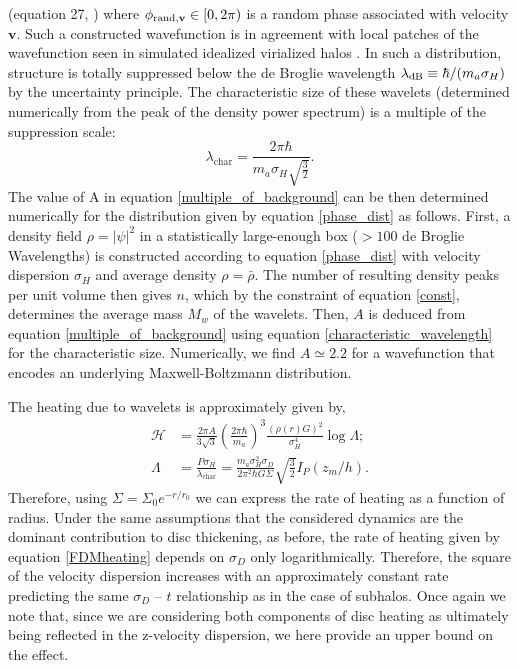\documentclass[usenatbib]{mnras}
\begin{document}
(equation 27, \cite{Schrodinger-Poisson}) where $\phi_{{\rm rand},\mathbf{v}}\in[0,2\pi)$ is a random phase associated with velocity $\mathbf{v}$.
Such a constructed wavefunction is in agreement with local patches of the wavefunction seen in simulated idealized virialized halos \citep{BECDM}.
In such a distribution, structure is totally suppressed below the de Broglie wavelength $\lambda_{\rm dB} \equiv \hbar/(m_a \sigma_H)$ by the uncertainty principle.
The characteristic size of these wavelets (determined numerically from the peak of the density power spectrum) is a multiple of the suppression scale:
\begin{equation} \label{characteristic_wavelength}
\lambda_{\text{char}} = \frac{ 2 \pi \hbar}{m_a \sigma_H \sqrt{\frac{3}{2}}}.
\end{equation}
The value of A in equation \eqref{multiple_of_background} can be then determined numerically for the distribution given by equation \eqref{phase_dist} as follows. First, a density field $\rho = |\psi|^2$ in a statistically large-enough box ($> 100$ de Broglie Wavelengths) is constructed according to equation \eqref{phase_dist} with velocity dispersion $\sigma_H$ and average density $\rho = \bar{\rho}$. The number of resulting density peaks per unit volume then gives $n$, which by the constraint of equation \eqref{const}, determines the average mass $M_w$ of the wavelets. Then, $A$ is deduced from equation \eqref{multiple_of_background} using equation \eqref{characteristic_wavelength} for the characteristic size. Numerically, we find $A\simeq 2.2$ for a wavefunction that encodes an underlying Maxwell-Boltzmann distribution.
\par
The heating due to wavelets is approximately given by,
\begin{subequations} \label{FDMheating}
\begin{align}
\mathcal{H} & = \frac{2 \pi A}{3 \sqrt{3}} \left( \frac{2 \pi \hbar }{m_a} \right)^3 \frac{(\rho(r) G)^2}{\sigma_H^4} \log{\Lambda} ;
\\
\Lambda & = \frac{P \sigma_H}{\lambda_{\text{char}}} = \frac{m_a \sigma_H^2 \sigma_D}{2 \pi^2 \hbar G \Sigma} \sqrt{\tfrac{3}{2}} I_P(z_m / h) .
\end{align}
\end{subequations}
Therefore, using $\Sigma = \Sigma_0 e^{-r/r_0}$ we can express the rate of heating as a function of radius. Under the same assumptions that the considered dynamics are the dominant contribution to disc thickening, as before, the rate of heating given by equation {\color{red} \eqref{FDMheating}} depends on $\sigma_D$ only logarithmically. { \color{magenta} Therefore, the square of the velocity dispersion increases with an approximately constant rate predicting the same $\sigma_D$ -- $t$ relationship as in the case of subhalos.} Once again we note that, since we are considering both components of disc heating as ultimately being reflected in the z-velocity dispersion, we here provide an upper bound on the effect. 
\end{document}
